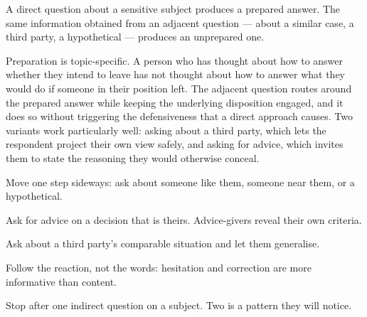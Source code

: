 


\begin{core}
A direct question about a sensitive subject produces a prepared answer. The same information obtained from an adjacent question --- about a similar case, a third party, a hypothetical --- produces an unprepared one.
\end{core}

\begin{mechanism}
Preparation is topic-specific. A person who has thought about how to answer whether they intend to leave has not thought about how to answer what they would do if someone in their position left. The adjacent question routes around the prepared answer while keeping the underlying disposition engaged, and it does so without triggering the defensiveness that a direct approach causes. Two variants work particularly well: asking about a third party, which lets the respondent project their own view safely, and asking for advice, which invites them to state the reasoning they would otherwise conceal.
\end{mechanism}

\begin{application}
  \item Move one step sideways: ask about someone like them, someone near them, or a hypothetical.
  \item Ask for advice on a decision that is theirs. Advice-givers reveal their own criteria.
  \item Ask about a third party's comparable situation and let them generalise.
  \item Follow the reaction, not the words: hesitation and correction are more informative than content.
  \item Stop after one indirect question on a subject. Two is a pattern they will notice.
\end{application}


